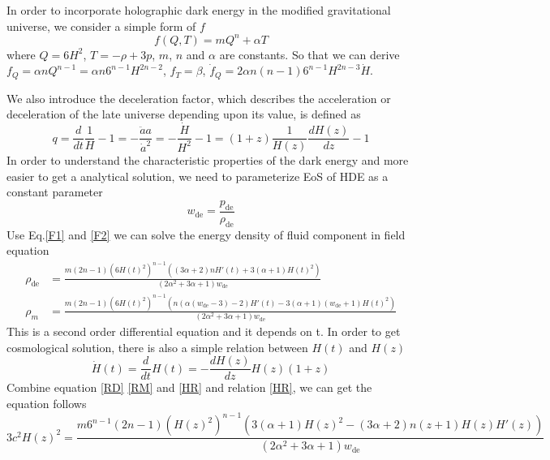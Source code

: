 \documentclass[a4paper,fleqn]{cas-sc}
\begin{document}
In order to incorporate holographic dark energy in the modified gravitational universe, we consider a simple form of $f$ 
\begin{equation}
    f(Q,T)=m Q^n+\alpha T
\end{equation}
where $Q=6H^2$, $T=-\rho+3p$, $m$, $n$ and $\alpha$ are constants. So that we can derive $f_Q=\alpha n Q^{n-1}=\alpha n 6^{n-1}H^{2n-2}$, $f_T=\beta$, $\dot{f}_Q=2\alpha n(n-1)6^{n-1}H^{2n-3}\dot{H}$.

We also introduce the deceleration factor, which describes the acceleration or deceleration of the late universe depending upon its value, is defined as
\begin{equation}
    q=\frac{d}{dt}\frac{1}{H}-1=-\frac{\ddot{a}a}{\dot{a}^2}=-\frac{\dot{H}}{H^2}-1=(1+z)\frac{1}{H(z)}\frac{dH(z)}{dz}-1   
\end{equation}
In order to understand the characteristic properties of the dark energy and more easier to get a analytical solution, we need to parameterize EoS of HDE as a constant parameter
\begin{equation}
    w_\text{de}=\frac{p_\text{de}}{\rho_\text{de}}
\end{equation}
Use Eq.\eqref{F1} and \eqref{F2} we can solve the energy density of fluid component in field equation
\begin{align}
    \rho_\text{de}&= \frac{m (2 n-1) \left(6H(t)^2\right)^{n-1} \left((3 \alpha +2) n H'(t)+3 (\alpha +1) H(t)^2\right)}{\left(2 \alpha ^2+3 \alpha +1\right) w_\text{de}} \label{RD}\\
    \rho_m&= \frac{m (2 n-1) \left(6H(t)^2\right)^{n-1} \left(n (\alpha  (w_\text{de}-3)-2) H'(t)-3 (\alpha +1) (w_\text{de}+1) H(t)^2\right)}{\left(2 \alpha ^2+3 \alpha +1\right) w_\text{de}}\label{RM}
\end{align}
This is a second order differential equation and it depends on t. In order to get cosmological solution, there is also a simple relation between $H(t)$ and $H(z)$
\begin{equation}
    \dot{H}(t)=\frac{d}{dt}H(t)=-\frac{d H(z)}{dz}H(z)(1+z)\label{HR}
\end{equation}
Combine equation \eqref{RD} \eqref{RM} and \eqref{HR} and relation \eqref{HR}, we can get the equation follows
\begin{equation}
    3 c^2 H(z)^2=\frac{m 6^{n-1} (2 n-1) \left(H(z)^2\right)^{n-1} \left(3 (\alpha +1) H(z)^2-(3 \alpha +2) n (z+1) H(z) H'(z)\right)}{\left(2 \alpha ^2+3 \alpha +1\right) {w_\text{de}}}
\end{equation}
\end{document}
